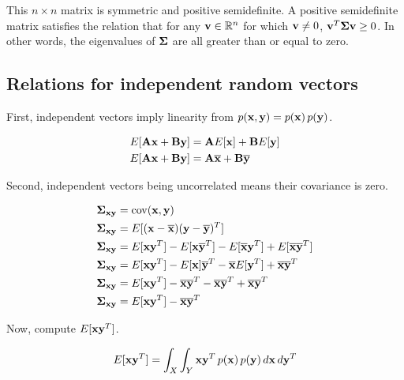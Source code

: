This $n \times n$ matrix is symmetric and positive semidefinite. A positive
semidefinite matrix satisfies the relation that for any
$\mathbf{v} \in \mathbb{R}^n$ for which $\mathbf{v} \neq 0$,
$\mathbf{v}^T \mathbf{\Sigma} \mathbf{v} \geq 0$. In other words, the eigenvalues of
$\mathbf{\Sigma}$ are all greater than or equal to zero.

\subsection{Relations for independent random vectors}

First, independent vectors imply linearity from
$p(\mathbf{x}, \mathbf{y}) = p(\mathbf{x}) \,p(\mathbf{y})$.

\begin{align*}
  E[\mathbf{A}\mathbf{x} + \mathbf{B}\mathbf{y}] &= \mathbf{A}E[\mathbf{x}] + \mathbf{B}E[\mathbf{y}] \\
  E[\mathbf{A}\mathbf{x} + \mathbf{B}\mathbf{y}] &= \mathbf{A}\overline{\mathbf{x}} + \mathbf{B}\overline{\mathbf{y}}
\end{align*}

Second, independent vectors being uncorrelated means their covariance is zero.

\begin{align}
  \mathbf{\Sigma}_{\mathbf{x}\mathbf{y}} &= \operatorname{cov}(\mathbf{x}, \mathbf{y}) \nonumber \\
  \mathbf{\Sigma}_{\mathbf{x}\mathbf{y}} &= E[(\mathbf{x} - \overline{\mathbf{x}})
    (\mathbf{y} - \overline{\mathbf{y}})^T] \nonumber \\
  \mathbf{\Sigma}_{\mathbf{x}\mathbf{y}} &= E[\mathbf{x}\mathbf{y}^T] -
    E[\mathbf{x}\overline{\mathbf{y}}^T] - E[\overline{\mathbf{x}}\mathbf{y}^T] +
    E[\overline{\mathbf{x}}\overline{\mathbf{y}}^T] \nonumber \\
  \mathbf{\Sigma}_{\mathbf{x}\mathbf{y}} &= E[\mathbf{x}\mathbf{y}^T] -
    E[\mathbf{x}]\overline{\mathbf{y}}^T - \overline{\mathbf{x}}E[\mathbf{y}^T] +
    \overline{\mathbf{x}}\overline{\mathbf{y}}^T \nonumber \\
  \mathbf{\Sigma}_{\mathbf{x}\mathbf{y}} &= E[\mathbf{x}\mathbf{y}^T] -
    \overline{\mathbf{x}}\overline{\mathbf{y}}^T - \overline{\mathbf{x}}\overline{\mathbf{y}}^T +
    \overline{\mathbf{x}}\overline{\mathbf{y}}^T \nonumber \\
  \mathbf{\Sigma}_{\mathbf{x}\mathbf{y}} &= E[\mathbf{x}\mathbf{y}^T] -
    \overline{\mathbf{x}}\overline{\mathbf{y}}^T \label{eq:prb_sigma}
\end{align}

Now, compute $E[\mathbf{x}\mathbf{y}^T]$.

\begin{equation*}
  E[\mathbf{x}\mathbf{y}^T] = \int_X \int_Y \mathbf{x}\mathbf{y}^T \,p(\mathbf{x})
    \,p(\mathbf{y}) \,d\mathbf{x} \,d\mathbf{y}^T
\end{equation*}

